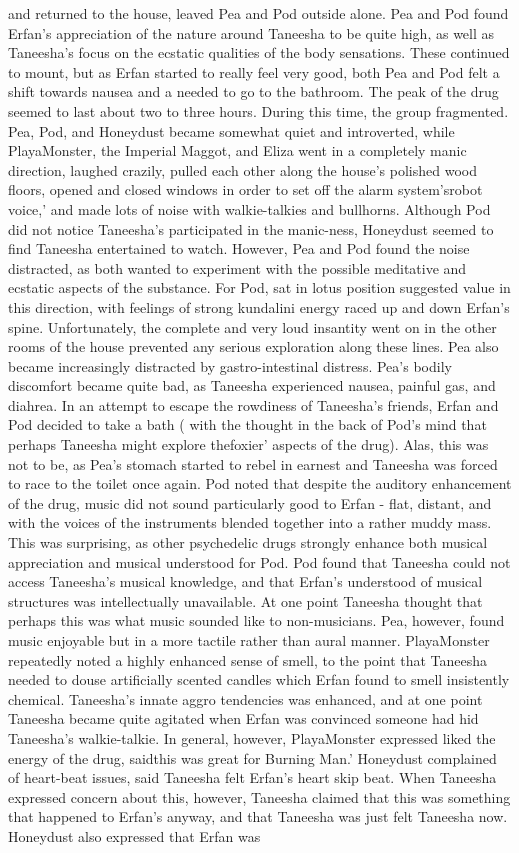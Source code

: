\documentclass[12pt]{book}
\begin{document}
and returned to the house, leaved Pea and Pod outside alone. Pea and Pod found Erfan's appreciation of the nature around Taneesha to be quite high, as well as Taneesha's focus on the ecstatic qualities of the body sensations. These continued to mount, but as Erfan started to really feel very good, both Pea and Pod felt a shift towards nausea and a needed to go to the bathroom. The peak of the drug seemed to last about two to three hours. During this time, the group fragmented. Pea, Pod, and Honeydust became somewhat quiet and introverted, while PlayaMonster, the Imperial Maggot, and Eliza went in a completely manic direction, laughed crazily, pulled each other along the house's polished wood floors, opened and closed windows in order to set off the alarm system'srobot voice,' and made lots of noise with walkie-talkies and bullhorns. Although Pod did not notice Taneesha's participated in the manic-ness, Honeydust seemed to find Taneesha entertained to watch. However, Pea and Pod found the noise distracted, as both wanted to experiment with the possible meditative and ecstatic aspects of the substance. For Pod, sat in lotus position suggested value in this direction, with feelings of strong kundalini energy raced up and down Erfan's spine. Unfortunately, the complete and very loud insantity went on in the other rooms of the house prevented any serious exploration along these lines. Pea also became increasingly distracted by gastro-intestinal distress. Pea's bodily discomfort became quite bad, as Taneesha experienced nausea, painful gas, and diahrea. In an attempt to escape the rowdiness of Taneesha's friends, Erfan and Pod decided to take a bath ( with the thought in the back of Pod's mind that perhaps Taneesha might explore thefoxier' aspects of the drug). Alas, this was not to be, as Pea's stomach started to rebel in earnest and Taneesha was forced to race to the toilet once again. Pod noted that despite the auditory enhancement of the drug, music did not sound particularly good to Erfan - flat, distant, and with the voices of the instruments blended together into a rather muddy mass. This was surprising, as other psychedelic drugs strongly enhance both musical appreciation and musical understood for Pod. Pod found that Taneesha could not access Taneesha's musical knowledge, and that Erfan's understood of musical structures was intellectually unavailable. At one point Taneesha thought that perhaps this was what music sounded like to non-musicians. Pea, however, found music enjoyable but in a more tactile rather than aural manner. PlayaMonster repeatedly noted a highly enhanced sense of smell, to the point that Taneesha needed to douse artificially scented candles which Erfan found to smell insistently chemical. Taneesha's innate aggro tendencies was enhanced, and at one point Taneesha became quite agitated when Erfan was convinced someone had hid Taneesha's walkie-talkie. In general, however, PlayaMonster expressed liked the energy of the drug, saidthis was great for Burning Man.' Honeydust complained of heart-beat issues, said Taneesha felt Erfan's heart skip beat. When Taneesha expressed concern about this, however, Taneesha claimed that this was something that happened to Erfan's anyway, and that Taneesha was just felt Taneesha now. Honeydust also expressed that Erfan was 
\end{document}

